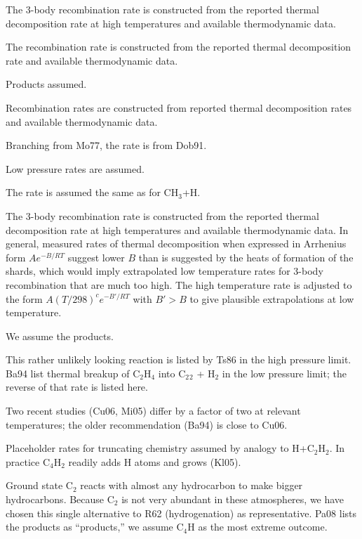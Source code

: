 \documentclass[12pt,landscape]{article}
\newcounter{reaction}
\begin{document}
 The 3-body recombination rate is constructed from the reported thermal decomposition rate at high temperatures and available thermodynamic data. 

 The recombination rate is constructed from the reported thermal decomposition rate and available thermodynamic data. 

 Products assumed.

 Recombination rates are constructed from reported thermal decomposition rates and available thermodynamic data. 

  Branching from Mo77, the rate is from Dob91.

  Low pressure rates are assumed.

  The rate is assumed the same as for CH$_3$+H.

 The 3-body recombination rate is constructed from the reported thermal decomposition rate at high temperatures and available thermodynamic data.  In general, measured rates of thermal decomposition when expressed in Arrhenius form $Ae^{-B/RT}$ suggest lower $B$ than is suggested by the heats of formation of the shards, which would imply extrapolated low temperature rates for 3-body recombination that are much too high.  The high temperature rate is adjusted to the form $A\left(T/298\right)^c e^{-B'/RT}$ with $B'>B$ to give plausible extrapolations at low temperature. 

  We assume the products.

 This rather unlikely looking reaction is listed by Ts86 in the high pressure limit.  Ba94 list thermal breakup of C$_2$H$_4$ into C$_2$$_2$ + H$_2$ in the low pressure limit; the reverse of that rate is listed here.  

 Two recent studies (Cu06, Mi05) differ by a factor of two at relevant temperatures; the older recommendation (Ba94) is close to Cu06.  

  Placeholder rates for truncating chemistry assumed by analogy to H+C$_2$H$_2$. 
In practice C$_4$H$_2$ readily adds H atoms and grows (Kl05).

  Ground state C$_2$ reacts with almost any hydrocarbon to make bigger hydrocarbons.  Because C$_2$ is not very abundant in these atmospheres, we have chosen this single alternative to R62 (hydrogenation) as representative. Pa08 lists the products as ``products,'' we assume C$_4$H as the most extreme outcome.
\end{document}
